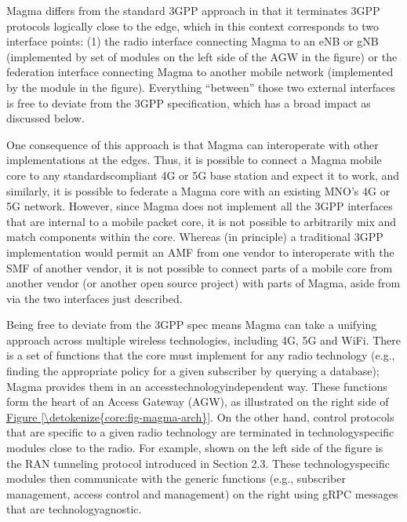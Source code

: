 \documentclass[a4paper,11pt,english]{sphinxmanual}
\begin{document}
\sphinxAtStartPar
Magma differs from the standard 3GPP approach in that it terminates
3GPP protocols logically close to the edge, which in this context
corresponds to two interface points: (1) the radio interface
connecting Magma to an eNB or gNB (implemented by set of modules on
the left side of the AGW in the figure) or the federation interface
connecting Magma to another mobile network (implemented by the
 module in the figure). Everything “between” those
two external interfaces is free to deviate from the 3GPP specification,
which has a broad impact as discussed below.

\sphinxAtStartPar
One consequence of this approach is that Magma can interoperate with
other implementations  at the edges. Thus, it is possible to
connect a Magma mobile core to any standards\sphinxhyphen{}compliant 4G or 5G base
station and expect it to work, and similarly, it is possible to
federate a Magma core with an existing MNO’s 4G or 5G network.
However, since Magma does not implement all the 3GPP interfaces that
are internal to a mobile packet core, it is not possible to
arbitrarily mix and match components within the core. Whereas (in
principle) a traditional 3GPP implementation would permit an AMF from
one vendor to interoperate with the SMF of another vendor, it is not
possible to connect parts of a mobile core from another vendor (or
another open source project) with parts of Magma, aside from via the
two interfaces just described.

\sphinxAtStartPar
Being free to deviate from the 3GPP spec means Magma can take a
unifying approach across multiple wireless technologies, including 4G,
5G and WiFi. There is a set of functions that the core must implement
for any radio technology (e.g., finding the appropriate policy for a
given subscriber by querying a database); Magma provides them in an
access\sphinxhyphen{}technology\sphinxhyphen{}independent way. These functions form the heart of
an Access Gateway (AGW), as illustrated on the right side of
\hyperref[\detokenize{core:fig-magma-arch}]{Figure \ref{\detokenize{core:fig-magma-arch}}}. On the other hand, control
protocols that are specific to a given radio technology are terminated
in technology\sphinxhyphen{}specific modules close to the radio. For example, 
shown on the left side of the figure is the RAN tunneling protocol
introduced in Section 2.3. These technology\sphinxhyphen{}specific modules then
communicate with the generic functions (e.g., subscriber management,
access control and management) on the right using gRPC messages that
are technology\sphinxhyphen{}agnostic.
\end{document}

